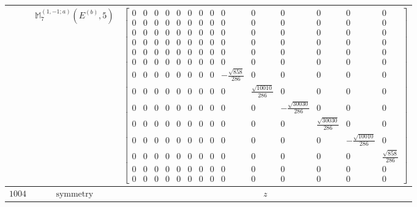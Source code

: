 \documentclass[fleqn,8pt,landscape]{jsarticle}
\begin{document}
\begin{longtable}{ccc}
$  $ & $ \mathbb{M}_{7}^{(1,-1;a)}(E^{(b)},5) $ & $ \begin{bmatrix} 0 & 0 & 0 & 0 & 0 & 0 & 0 & 0 & 0 & 0 & 0 & 0 & 0 & 0 \\ 0 & 0 & 0 & 0 & 0 & 0 & 0 & 0 & 0 & 0 & 0 & 0 & 0 & 0 \\ 0 & 0 & 0 & 0 & 0 & 0 & 0 & 0 & 0 & 0 & 0 & 0 & 0 & 0 \\ 0 & 0 & 0 & 0 & 0 & 0 & 0 & 0 & 0 & 0 & 0 & 0 & 0 & 0 \\ 0 & 0 & 0 & 0 & 0 & 0 & 0 & 0 & 0 & 0 & 0 & 0 & 0 & 0 \\ 0 & 0 & 0 & 0 & 0 & 0 & 0 & 0 & 0 & 0 & 0 & 0 & 0 & 0 \\ 0 & 0 & 0 & 0 & 0 & 0 & 0 & 0 & - \frac{\sqrt{858}}{286} & 0 & 0 & 0 & 0 & 0 \\ 0 & 0 & 0 & 0 & 0 & 0 & 0 & 0 & 0 & \frac{\sqrt{10010}}{286} & 0 & 0 & 0 & 0 \\ 0 & 0 & 0 & 0 & 0 & 0 & 0 & 0 & 0 & 0 & - \frac{\sqrt{30030}}{286} & 0 & 0 & 0 \\ 0 & 0 & 0 & 0 & 0 & 0 & 0 & 0 & 0 & 0 & 0 & \frac{\sqrt{30030}}{286} & 0 & 0 \\ 0 & 0 & 0 & 0 & 0 & 0 & 0 & 0 & 0 & 0 & 0 & 0 & - \frac{\sqrt{10010}}{286} & 0 \\ 0 & 0 & 0 & 0 & 0 & 0 & 0 & 0 & 0 & 0 & 0 & 0 & 0 & \frac{\sqrt{858}}{286} \\ 0 & 0 & 0 & 0 & 0 & 0 & 0 & 0 & 0 & 0 & 0 & 0 & 0 & 0 \\ 0 & 0 & 0 & 0 & 0 & 0 & 0 & 0 & 0 & 0 & 0 & 0 & 0 & 0 \end{bmatrix} $ \\ \hline
$ 1004 $ & $ \text{symmetry} $ & $ z $ \\

\end{longtable}
\end{document}
